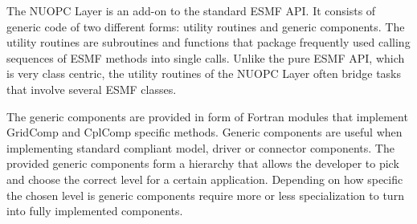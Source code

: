 %
The NUOPC Layer is an add-on to the standard ESMF API. It consists of generic code of two different forms: utility routines and generic components. The utility routines are subroutines and functions that package frequently used calling sequences of ESMF methods into single calls. Unlike the pure ESMF API, which is very class centric, the utility routines of the NUOPC Layer often bridge tasks that involve several ESMF classes.

The generic components are provided in form of Fortran modules that implement GridComp and CplComp specific methods. Generic components are useful when implementing standard compliant model, driver or connector components. The provided generic components form a hierarchy that allows the developer to pick and choose the correct level for a certain application. Depending on how specific the chosen level is generic components require more or less specialization to turn into fully implemented components.
